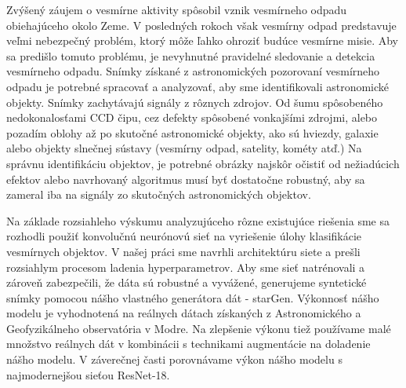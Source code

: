 Zvýšený záujem o vesmírne aktivity spôsobil vznik vesmírneho odpadu obiehajúceho okolo Zeme. V posledných rokoch však vesmírny odpad predstavuje veľmi nebezpečný problém, ktorý môže ľahko ohroziť budúce vesmírne misie. Aby sa predišlo tomuto problému, je nevyhnutné pravidelné sledovanie a detekcia vesmírneho odpadu. Snímky získané z astronomických pozorovaní vesmírneho odpadu je potrebné spracovať a analyzovať, aby sme identifikovali astronomické objekty. Snímky zachytávajú signály z rôznych zdrojov. Od šumu spôsobeného nedokonalosťami CCD čipu, cez defekty spôsobené vonkajšími zdrojmi, alebo pozadím oblohy až po skutočné astronomické objekty, ako sú hviezdy, galaxie alebo objekty slnečnej sústavy (vesmírny odpad, satelity, kométy atď.)
Na správnu identifikáciu objektov, je potrebné obrázky najskôr očistiť od nežiadúcich efektov alebo navrhovaný algoritmus musí byť dostatočne robustný, aby sa zameral iba na signály zo skutočných astronomických objektov.

Na základe rozsiahleho výskumu analyzujúceho rôzne existujúce riešenia sme sa rozhodli použiť konvolučnú neurónovú sieť na vyriešenie úlohy klasifikácie vesmírnych objektov. V našej práci sme navrhli architektúru siete a prešli rozsiahlym procesom ladenia hyperparametrov. Aby sme sieť natrénovali a zároveň zabezpečili, že dáta sú robustné a vyvážené, generujeme syntetické snímky pomocou nášho vlastného generátora dát - starGen. Výkonnosť nášho modelu je vyhodnotená na reálnych dátach získaných z Astronomického a Geofyzikálneho observatória v Modre. Na zlepšenie výkonu tiež používame malé množstvo reálnych dát v kombinácii s technikami augmentácie na doladenie nášho modelu. V záverečnej časti porovnávame výkon nášho modelu s najmodernejšou sieťou ResNet-18.
